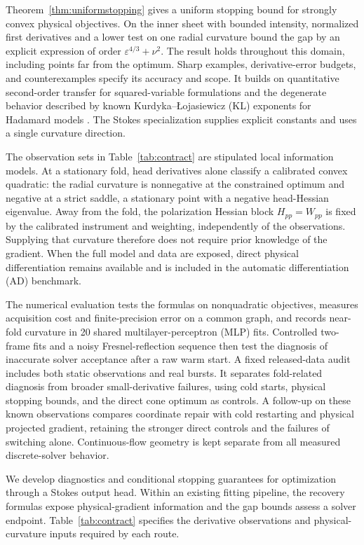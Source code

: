 Theorem~\ref{thm:uniformstopping} gives a uniform stopping bound for strongly convex physical objectives. On the inner sheet with bounded intensity, normalized first derivatives and a lower test on one radial curvature bound the gap by an explicit expression of order $\varepsilon^{4/3}+\nu^2$. The result holds throughout this domain, including points far from the optimum. Sharp examples, derivative-error budgets, and counterexamples specify its accuracy and scope. It builds on quantitative second-order transfer for squared-variable formulations \cite{dingwright} and the degenerate behavior described by known Kurdyka--\L{}ojasiewicz (KL) exponents for Hadamard models \cite{ouyang}. The Stokes specialization supplies explicit constants and uses a single curvature direction.

The observation sets in Table~\ref{tab:contract} are stipulated local information models. At a stationary fold, head derivatives alone classify a calibrated convex quadratic: the radial curvature is nonnegative at the constrained optimum and negative at a strict saddle, a stationary point with a negative head-Hessian eigenvalue. Away from the fold, the polarization Hessian block $H_{pp}=W_{pp}$ is fixed by the calibrated instrument and weighting, independently of the observations. Supplying that curvature therefore does not require prior knowledge of the gradient. When the full model and data are exposed, direct physical differentiation remains available and is included in the automatic differentiation (AD) benchmark.

The numerical evaluation tests the formulas on nonquadratic objectives, measures acquisition cost and finite-precision error on a common graph, and records near-fold curvature in 20 shared multilayer-perceptron (MLP) fits. Controlled two-frame fits and a noisy Fresnel-reflection sequence then test the diagnosis of inaccurate solver acceptance after a raw warm start. A fixed released-data audit includes both static observations and real bursts. It separates fold-related diagnosis from broader small-derivative failures, using cold starts, physical stopping bounds, and the direct cone optimum as controls. A follow-up on these known observations compares coordinate repair with cold restarting and physical projected gradient, retaining the stronger direct controls and the failures of switching alone. Continuous-flow geometry is kept separate from all measured discrete-solver behavior.

We develop diagnostics and conditional stopping guarantees for optimization through a Stokes output head. Within an existing fitting pipeline, the recovery formulas expose physical-gradient information and the gap bounds assess a solver endpoint. Table~\ref{tab:contract} specifies the derivative observations and physical-curvature inputs required by each route.

